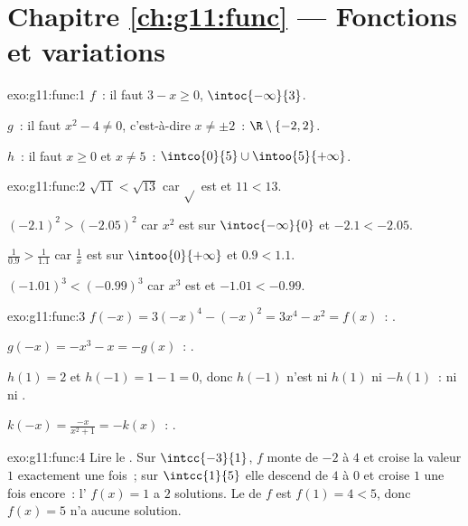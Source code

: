 \section*{Chapitre \ref{ch:g11:func} --- Fonctions et variations}

\begin{solution}{exo:g11:func:1}
$f$~: il faut $3 - x \geq 0$, 
$\intoc{-\infty}{3}$.

$g$~: il faut $x^2 - 4 \neq 0$, c'est-à-dire $x \neq \pm 2$~:  $\R \setminus \{-2, 2\}$.

$h$~: il faut $x \geq 0$ et $x \neq 5$~: 
$\intco{0}{5} \cup \intoo{5}{+\infty}$.
\end{solution}

\begin{solution}{exo:g11:func:2}
$\sqrt{11} < \sqrt{13}$ car $\sqrt{}$ est  et $11 < 13$.

$(-2.1)^2 > (-2.05)^2$ car $x^2$ est  sur
$\intoc{-\infty}{0}$ et $-2.1 < -2.05$.

$\frac{1}{0.9} > \frac{1}{1.1}$ car $\frac1x$ est  sur
$\intoo{0}{+\infty}$ et $0.9 < 1.1$.

$(-1.01)^3 < (-0.99)^3$ car $x^3$ est  et $-1.01 < -0.99$.
\end{solution}

\begin{solution}{exo:g11:func:3}
$f(-x) = 3(-x)^4 - (-x)^2 = 3x^4 - x^2 = f(x)$~: .

$g(-x) = -x^3 - x = -g(x)$~: .

$h(1) = 2$ et $h(-1) = 1 - 1 = 0$, donc $h(-1)$ n'est ni $h(1)$ ni
$-h(1)$~: ni  ni .

$k(-x) = \frac{-x}{x^2+1} = -k(x)$~: .
\end{solution}

\begin{solution}{exo:g11:func:4}
Lire le . Sur $\intcc{-3}{1}$, $f$ monte de $-2$ à
$4$ et croise la valeur $1$ exactement une fois~; sur $\intcc{1}{5}$
elle descend de $4$ à $0$ et croise $1$ une fois encore~: l'
$f(x) = 1$ a $2$ solutions. Le  de $f$ est $f(1) = 4 < 5$, donc
$f(x) = 5$ n'a aucune solution.
\end{solution}

